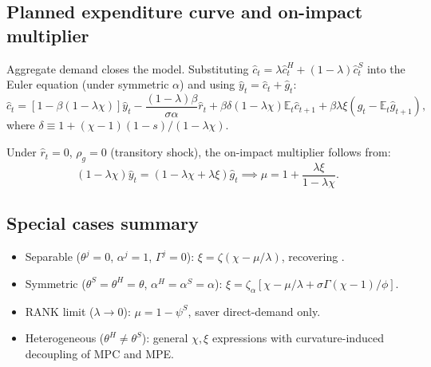 \subsection{Planned expenditure curve and on-impact multiplier}\label{app:PE-mult}
Aggregate demand closes the model. Substituting $\hat c_{t}=\lambda\hat c^{H}_{t}+(1-\lambda)\hat c^{S}_{t}$ into the Euler equation (under symmetric $\alpha$) and using $\hat y_{t}=\hat c_{t}+\hat g_{t}$:
\begin{equation}\label{eq:A-PE}
  \hat c_{t}=[1-\beta(1-\lambda\chi)]\hat y_{t}-\frac{(1-\lambda)\beta}{\sigma\alpha}\hat r_{t}+\beta\delta(1-\lambda\chi)\mathbb{E}_{t}\hat c_{t+1}+\beta\lambda\xi(\hat g_{t}-\mathbb{E}_{t}\hat g_{t+1}),
\end{equation}
where $\delta\equiv 1+(\chi-1)(1-s)/(1-\lambda\chi)$.

Under $\hat r_{t}=0$, $\rho_{g}=0$ (transitory shock), the on-impact multiplier follows from:
\[
  (1-\lambda\chi)\hat y_{t}=(1-\lambda\chi+\lambda\xi)\hat g_{t}\implies\mu=1+\frac{\lambda\xi}{1-\lambda\chi}.
\]

\subsection{Special cases summary}\label{app:cases}
\begin{itemize}
  \item Separable ($\theta^{j}=0$, $\alpha^{j}=1$, $\Gamma^{j}=0$): $\xi=\zeta(\chi-\mu/\lambda)$, recovering \bilbiie{}.
  \item Symmetric ($\theta^{S}=\theta^{H}=\theta$, $\alpha^{H}=\alpha^{S}=\alpha$): $\xi=\zeta_{\alpha}[\chi-\mu/\lambda+\sigma\Gamma(\chi-1)/\phi]$.
  \item RANK limit ($\lambda\to 0$): $\mu=1-\psi^{S}$, saver direct-demand only.
  \item Heterogeneous ($\theta^{H}\neq\theta^{S}$): general $\chi,\xi$ expressions with curvature-induced decoupling of MPC and MPE.
\end{itemize}
